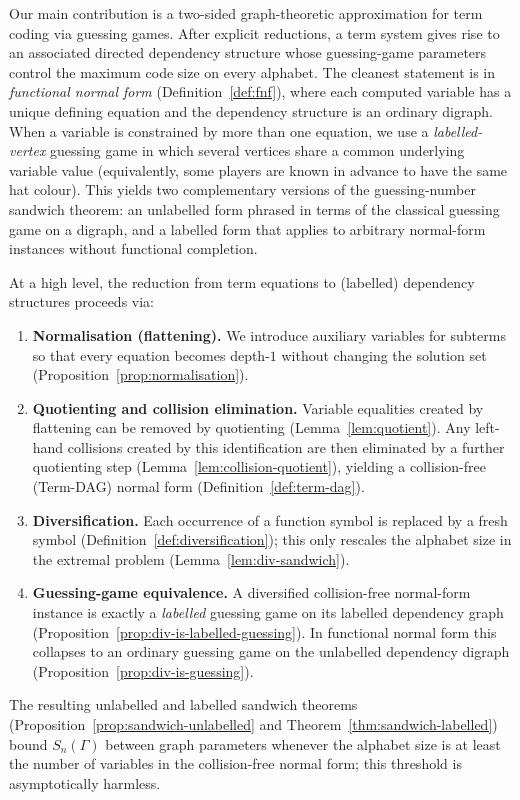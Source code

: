 \documentclass[11pt]{article}
\theoremstyle{plain}
\theoremstyle{definition}
\theoremstyle{definition}
\theoremstyle{remark}
\newcommand{\Sn}{S_n}
\begin{document}
Our main contribution is a two-sided graph-theoretic approximation for term coding via guessing games.
After explicit reductions, a term system gives rise to an associated directed dependency structure whose guessing-game
parameters control the maximum code size on every alphabet.
The cleanest statement is in \emph{functional normal form} (Definition~\ref{def:fnf}), where each computed variable
has a unique defining equation and the dependency structure is an ordinary digraph.
When a variable is constrained by more than one equation, we use a \emph{labelled-vertex} guessing game in which
several vertices share a common underlying variable value (equivalently, some players are known in advance to have
the same hat colour).
This yields two complementary versions of the guessing-number sandwich theorem: an unlabelled form phrased in terms
of the classical guessing game on a digraph, and a labelled form that applies to arbitrary normal-form instances
without functional completion.

At a high level, the reduction from term equations to (labelled) dependency structures proceeds via:
\begin{enumerate}
\item \textbf{Normalisation (flattening).} We introduce auxiliary variables for subterms so that every equation becomes
depth-$1$ without changing the solution set (Proposition~\ref{prop:normalisation}).
\item \textbf{Quotienting and collision elimination.} Variable equalities created by flattening can be removed by
quotienting (Lemma~\ref{lem:quotient}). Any left-hand collisions created by this identification are then eliminated by
a further quotienting step (Lemma~\ref{lem:collision-quotient}), yielding a collision-free (Term-DAG) normal form
(Definition~\ref{def:term-dag}).
\item \textbf{Diversification.} Each occurrence of a function symbol is replaced by a fresh symbol
(Definition~\ref{def:diversification}); this only rescales the alphabet size in the extremal problem
(Lemma~\ref{lem:div-sandwich}).
\item \textbf{Guessing-game equivalence.} A diversified collision-free normal-form instance is exactly a \emph{labelled}
guessing game on its labelled dependency graph (Proposition~\ref{prop:div-is-labelled-guessing}). In functional normal
form this collapses to an ordinary guessing game on the unlabelled dependency digraph
(Proposition~\ref{prop:div-is-guessing}).
\end{enumerate}
The resulting unlabelled and labelled sandwich theorems (Proposition~\ref{prop:sandwich-unlabelled} and
Theorem~\ref{thm:sandwich-labelled}) bound $\Sn(\Gamma)$ between graph parameters whenever the alphabet size
is at least the number of variables in the collision-free normal form; this threshold is asymptotically harmless.
\end{document}
